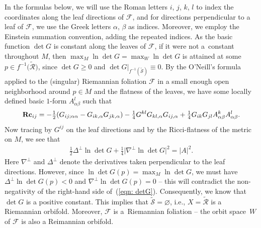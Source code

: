 \documentclass[pdftex]{sigma}
\numberwithin{equation}{section}
\newcommand{\Rc}{\operatorname{\bf Rc}}
\begin{document}
In the formulas below, we will use the Roman letters $i$, $j$, $k$, $l$ to index the
coordinates along the leaf directions of $\mathcal{F}$, and for directions
perpendicular to a leaf of $\mathcal{F}$, we use the Greek letters
$\alpha$, $\beta$ as indices. Moreover, we employ the Einstein
summation convention, adding the repeated indices. As the basic function
$\det G$ is constant along the leaves of $\mathcal{F}$, if it were not a~constant throughout $M$, then $\max_M \ln \det G=\max_W \ln \det G$ is attained
at some $p\in f^{-1}\big(\tilde{\mathcal{R}}\big)$, since $\det G\ge 0$ and $\det
G|_{f^{-1}(\tilde{\mathcal{S}})}\equiv 0$. By the O'Neill's formula~\cite{ONeill} applied to the (singular) Riemannian foliation $\mathcal{F}$ in a
small enough open neighborhood around $p\in M$ and the flatness of the leaves,
we have some locally defined basic $1$-form $A_{\alpha\beta}^l$ such that
\begin{align}\label{eqn: ONeill_G}
\Rc_{ij} = -\tfrac{1}{2} ( G_{ij;\alpha\alpha}
-G_{ik,\alpha}G_{jk,\alpha} ) -\tfrac{1}{4}G^{kl}G_{kl,\alpha}
G_{ij,\alpha}+\tfrac{1}{4}G_{ik}G_{jl}A^k_{\alpha\beta}A^l_{\alpha\beta}.
\end{align}
Now tracing by $G^{ij}$ on the leaf directions and by the Ricci-flatness of the
metric on $M$, we see that
\begin{align}\label{eqn: detG}
\tfrac{1}{2}\Delta^{\perp}\ln \det G+\tfrac{1}{4}\big|\nabla^{\perp} \ln \det G\big|^2 = |A|^2.
\end{align}
Here $\nabla^{\perp}$ and $\Delta^{\perp}$ denote the derivatives taken
perpendicular to the leaf directions. However, since $\ln \det G(p)=\max_M \ln
\det G$, we must have $\Delta^{\perp}\ln\det G(p)<0$ and $\nabla^{\perp}\ln
\det G(p)=0$ -- this will contradict the non-negativity of the right-hand side
of~(\ref{eqn: detG}). Consequently, we know that $\det G$ is a positive
constant. This implies that $\tilde{\mathcal{S}}=\varnothing$, i.e.,
$X=\tilde{\mathcal{R}}$ is a Riemannian orbifold. Moreover, $\mathcal{F}$ is a~Riemannian foliation -- the orbit space~$W$ of $\mathcal{F}$ is
also a Reimannian orbifold.
\end{document}
